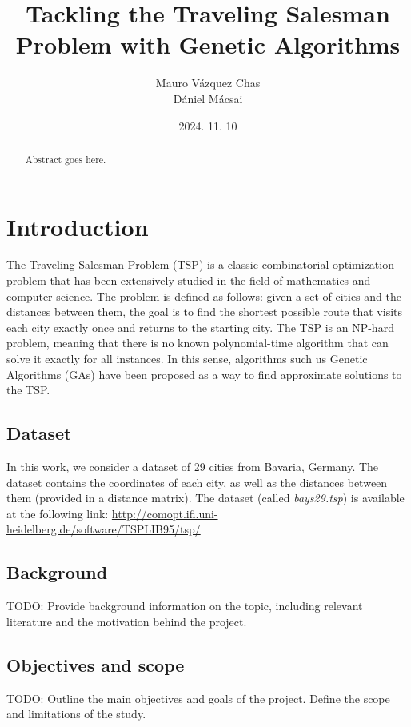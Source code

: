 \documentclass[12pt]{article}
\title{%
    \vspace{2in} %
    \textbf{Tackling the Traveling Salesman Problem with Genetic Algorithms}\\
    \vspace{2in}
}
\author{
    Mauro Vázquez Chas \\
    Dániel Mácsai
    \vspace{0.2in}
}
\date{2024. 11. 10}
\begin{document}
\maketitle
\thispagestyle{empty}

\begin{abstract}
    \noindent
    Abstract goes here.
\end{abstract}

\newpage

\tableofcontents
\newpage




\section{Introduction}
The Traveling Salesman Problem (TSP) is a classic combinatorial optimization problem that has been extensively studied in the field of mathematics and computer science. The problem is defined as follows: given a set of cities and the distances between them, the goal is to find the shortest possible route that visits each city exactly once and returns to the starting city. The TSP is an NP-hard problem, meaning that there is no known polynomial-time algorithm that can solve it exactly for all instances. In this sense, algorithms such us Genetic Algorithms (GAs) have been proposed as a way to find approximate solutions to the TSP.

\subsection{Dataset}
In this work, we consider a dataset of 29 cities from Bavaria, Germany. The dataset contains the coordinates of each city, as well as the distances between them (provided in a distance matrix). The dataset (called \textit{bays29.tsp}) is available at the following link: \url{http://comopt.ifi.uni-heidelberg.de/software/TSPLIB95/tsp/}


\subsection{Background}
TODO: Provide background information on the topic, including relevant literature and the motivation behind the project.

\subsection{Objectives and scope}
TODO: Outline the main objectives and goals of the project. Define the scope and limitations of the study.
\end{document}
